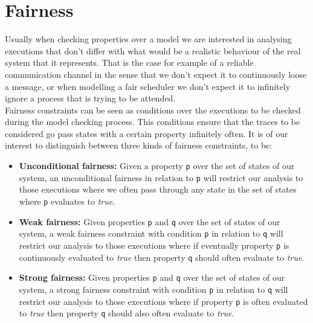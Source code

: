 \documentclass[12pt]{article}
\begin{document}


\section{Fairness}\label{fairness}

Usually when checking properties over a model we are interested in analysing 
executions that don't differ with what would be a realistic behaviour of the
real system that it represents. That is the case for example of a reliable
communication channel in the sense that we don't expect it to continuously
loose a message, or when modelling a fair scheduler we don't expect it to
infinitely ignore a process that is trying to be attended.\\
Fairness constraints can be seen as conditions over the executions to be checked
during the model checking process. This conditions ensure that the traces
to be considered go pass states with a certain property infinitely often.
It is of our interest to distinguish between three kinds of fairness
constraints, to be:
\begin{itemize}
\item \textbf{Unconditional fairness:} Given a property \texttt{p} over the
set of states of our system, an unconditional fairness in relation to
\texttt{p} will restrict our analysis to those executions where we often pass
through any state in the set of states where \texttt{p} evaluates to
\textit{true}.

\item \textbf{Weak fairness:} Given properties \texttt{p} and \texttt{q}
over the set of states of our system, a weak fairness constraint with
condition \texttt{p} in relation to \texttt{q} will restrict our analysis
to those executions where if eventually property \texttt{p} is continuously
evaluated to \textit{true} then property \texttt{q} should often evaluate
to \textit{true}.

\item \textbf{Strong fairness:} Given properties \texttt{p} and \texttt{q}
over the set of states of our system, a strong fairness constraint with
condition \texttt{p} in relation to \texttt{q} will restrict our analysis
to those executions where if property \texttt{p} is often evaluated to 
\textit{true} then property \texttt{q} should also often evaluate to
\textit{true}.

\end{itemize}
\end{document}
